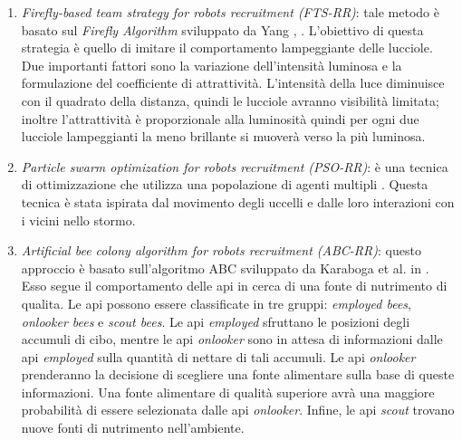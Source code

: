\begin{enumerate}
    \item \textit{Firefly-based team strategy for robots recruitment (FTS-RR)}: tale metodo è basato sul \textit{Firefly Algorithm} sviluppato da Yang \cite{yang2009firefly}, \cite{yang2010firefly}. 
    L'obiettivo di questa strategia è quello di imitare il comportamento lampeggiante delle lucciole.
    Due importanti fattori sono la variazione dell’intensità luminosa e la formulazione del coefficiente di attrattività. 
    L’intensità della luce diminuisce con il quadrato della distanza, quindi le lucciole avranno visibilità limitata; inoltre l’attrattività è proporzionale alla luminosità quindi per ogni due lucciole lampeggianti la meno brillante si muoverà verso la più luminosa.
    \item \textit{Particle swarm optimization  for robots recruitment (PSO-RR)}: è una tecnica di ottimizzazione che utilizza una popolazione di agenti multipli \cite{eberhart1995particle}.
    Questa tecnica è stata ispirata dal movimento degli uccelli e dalle loro interazioni con i vicini nello stormo.
    \item \textit{Artificial bee colony algorithm  for robots recruitment (ABC-RR)}: questo approccio è basato sull'algoritmo ABC sviluppato da Karaboga et al. in \cite{karaboga2009comparative}.
    Esso segue il comportamento delle api in cerca di una fonte di nutrimento di qualita. Le api possono essere classificate in tre gruppi: \textit{employed bees}, \textit{onlooker bees} e \textit{scout bees}. 
    Le api \textit{employed} sfruttano le posizioni degli accumuli di cibo, mentre le api \textit{onlooker} sono in attesa di informazioni dalle api \textit{employed} sulla quantità di nettare di tali accumuli. 
    Le api \textit{onlooker} prenderanno la decisione di scegliere una fonte alimentare sulla base di queste informazioni.
    Una fonte alimentare di qualità superiore avrà una maggiore probabilità di essere selezionata dalle api \textit{onlooker}. Infine, le api \textit{scout} trovano nuove fonti di nutrimento nell'ambiente.
\end{enumerate}